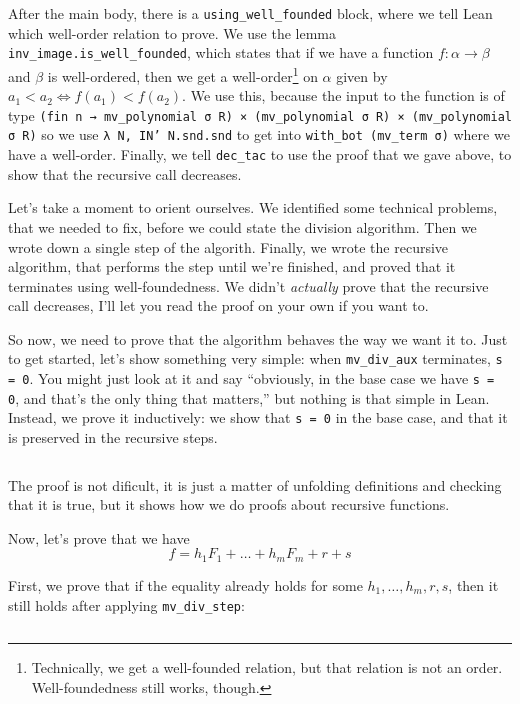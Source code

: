 \documentclass[a4paper, 12pt]{article}
\newcommand{\lean}[1]{\texttt{#1}}
\theoremstyle{changedot}
\theoremstyle{changedotbreak}
\theoremstyle{nonumberplain}
\begin{document}
After the main body, there is a \lean{using_well_founded} block, where we tell Lean which well-order relation to prove. We use the lemma \lean{inv_image.is_well_founded}, which states that if we have a function $f : \alpha \to \beta$ and $\beta$ is well-ordered, then we get a well-order\footnote{Technically, we get a well-founded relation, but that relation is not an order. Well-foundedness still works, though.} on $\alpha$ given by $a_{1} < a_{2} \iff f(a_{1}) < f(a_{2})$. We use this, because the input to the function is of type \lean{(fin n → mv_polynomial σ R) ×
  (mv_polynomial σ R) × (mv_polynomial σ R)} so we use \lean{λ N, IN' N.snd.snd} to get into \lean{with_bot (mv_term σ)} where we have a well-order. Finally, we tell \lean{dec_tac} to use the proof that we gave above, to show that the recursive call decreases.

Let's take a moment to orient ourselves. We identified some technical problems, that we needed to fix, before we could state the division algorithm. Then we wrote down a single step of the algorith. Finally, we wrote the recursive algorithm, that performs the step until we're finished, and proved that it terminates using well-foundedness. We didn't \textit{actually} prove that the recursive call decreases, I'll let you read the proof on your own if you want to.

So now, we need to prove that the algorithm behaves the way we want it to. Just to get started, let's show something very simple: when \lean{mv_div_aux} terminates, \lean{s = 0}. You might just look at it and say ``obviously, in the base case we have \lean{s = 0}, and that's the only thing that matters,'' but nothing is that simple in Lean. Instead, we prove it inductively: we show that \lean{s = 0} in the base case, and that it is preserved in the recursive steps.

\inputminted[firstline=334, lastline=357]{lean}{../src/mv_division.lean}

The proof is not dificult, it is just a matter of unfolding definitions and checking that it is true, but it shows how we do proofs about recursive functions.

Now, let's prove that we have \[f = h_{1}F_{1} + \dots + h_{m}F_{m} + r + s\]

First, we prove that if the equality already holds for some $h_{1}, \dots, h_{m}, r, s$, then it still holds after applying \lean{mv_div_step}:

\inputminted[firstline=61, lastline=68]{lean}{../src/mv_division.lean}
\end{document}
